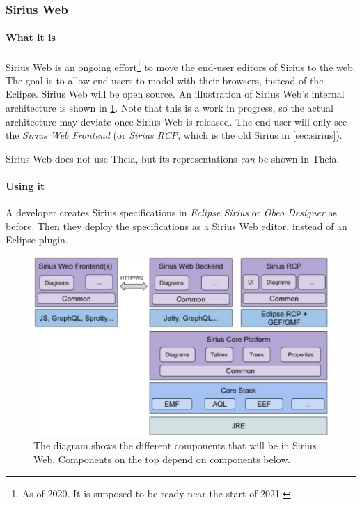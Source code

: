 
\subsubsection{Sirius Web}

\paragraph*{What it is}
Sirius Web is an ongoing effort\footnote{As of 2020. It is supposed to be ready near the start of 2021.} to move the end-user editors of Sirius to the web.
The goal is to allow end-users to model with their browsers, instead of the \gls{Eclipse}.
Sirius Web will be \gls{open source}.
An illustration of Sirius Web's internal architecture is shown in \cref{fig:sirius-web-architecture}. Note that this is a work in progress, so the actual architecture may deviate once Sirius Web is released.
The end-user will only see the \emph{Sirius Web Frontend} (or \emph{Sirius \acrshort{RCP}}, which is the old Sirius in \cref{sec:sirius}).

Sirius Web does not use Theia, but its representations \textit{can} be shown in Theia.~\cite{neilmackenzieSiriusWebXText2020}

\paragraph*{Using it} A developer creates Sirius specifications in \emph{Eclipse Sirius} or \emph{Obeo Designer} as before. 
Then they deploy the specifications as a Sirius Web editor, instead of an Eclipse plugin.

\begin{figure}[htbp]  %
  \centering
  \includegraphics[width=\textwidth]{figures/Sirius-future-web-architecture}
  \caption[The Sirius Web Architecture]{The diagram shows the different components that will be in Sirius Web. Components on the top depend on components below.~\cite[p.~37]{davidSiriusCon2018Sirius2018}}\label{fig:sirius-web-architecture}
\end{figure}
